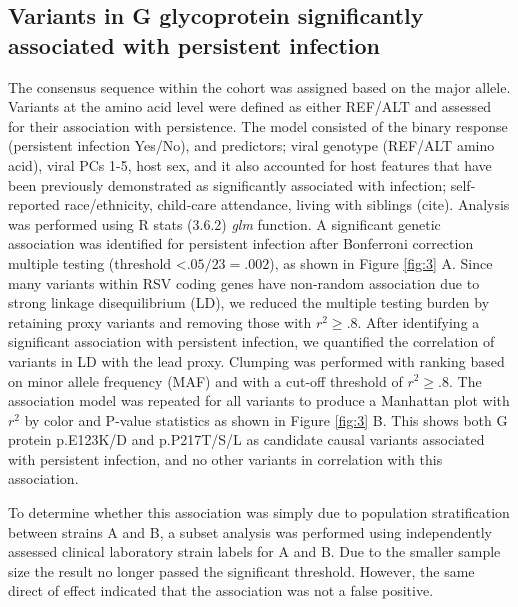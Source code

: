 \documentclass{article}
\begin{document}
\subsection{Variants in G glycoprotein significantly associated with persistent infection}
The consensus sequence within the cohort was assigned based on the major allele.
Variants at the amino acid level were defined as either REF/ALT and assessed for their association with persistence.
The model consisted of
the binary response (persistent infection Yes/No),
and predictors; viral genotype (REF/ALT amino acid), viral PCs 1-5, host sex, and it also accounted for host features that have been previously demonstrated as significantly associated with infection;
self-reported race/ethnicity, child-care attendance, living with siblings (cite).
Analysis was performed using R stats (3.6.2) \textit{glm} function. 
A significant genetic association was identified for persistent infection after Bonferroni correction multiple testing (threshold <$.05/23=.002$), 
as shown in 
Figure \ref{fig:3} A. 
Since many variants within RSV coding genes have non-random association due to strong linkage disequilibrium (LD), 
we reduced the multiple testing burden by retaining proxy variants and removing those with
$r^2 \ge .8$.
After identifying a significant association with persistent infection,
we quantified the correlation of variants in LD with the lead proxy.
Clumping was performed with ranking based on minor allele frequency (MAF) and with a cut-off threshold of $r^2 \ge .8$.
The association model was repeated for all variants to produce a Manhattan plot with $r^2$ by color and P-value statistics as shown in 
Figure \ref{fig:3} B.
This shows both G protein 
p.E123K/D and 
p.P217T/S/L as candidate causal variants associated with persistent infection, and no other variants in correlation with this association. 

To determine whether this association was simply due to population stratification between strains A and B, a subset analysis was performed using independently assessed clinical laboratory strain labels for A and B.
Due to the smaller sample size the result no longer passed the significant threshold. 
However, the same direct of effect indicated that the association was not a false positive. 
\end{document}
